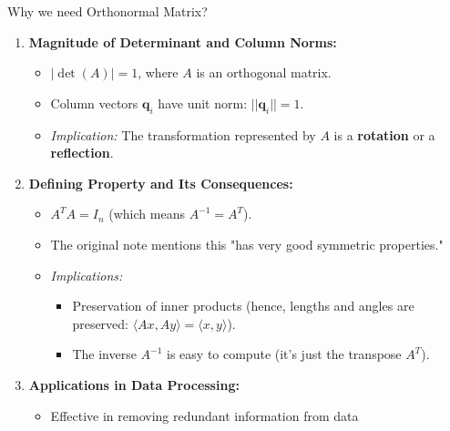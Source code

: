 \documentclass[aspectratio=169, UTF8]{ctexbeamer}
\begin{document}
\begin{frame}{Why we need Orthonormal Matrix?}
    \begin{enumerate}
        \item \textbf{Magnitude of Determinant and Column Norms:}
              \begin{itemize}
                  \item $|\det(A)| = 1$, where $A$ is an orthogonal matrix.
                  \item Column vectors $\bm{q}_i$ have unit norm: $||\bm{q}_i|| = 1$.
                  \item \textit{Implication:} The transformation represented by $A$ is a \textbf{rotation} or a \textbf{reflection}.
              \end{itemize}

        \item \textbf{Defining Property and Its Consequences:}
              \begin{itemize}
                  \item $A^T A = I_n$ (which means $A^{-1} = A^T$).
                  \item The original note mentions this "has very good symmetric properties."
                  \item \textit{Implications:}
                        \begin{itemize}
                            \item Preservation of inner products (hence, lengths and angles are preserved: $\langle Ax, Ay \rangle = \langle x, y \rangle$).
                            \item The inverse $A^{-1}$ is easy to compute (it's just the transpose $A^T$).
                        \end{itemize}
              \end{itemize}

        \item \textbf{Applications in Data Processing:}
              \begin{itemize}
                  \item Effective in removing redundant information from data
              \end{itemize}
    \end{enumerate}
\end{frame}
\end{document}
